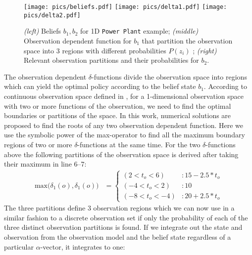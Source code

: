 \documentclass{article} %
\begin{document}
\begin{figure*}[tbp!]
\vspace{-6mm}
\centering
\hspace{-17mm}
\texttt{[image: pics/beliefs.pdf]}
\hspace{-12mm}
\texttt{[image: pics/delta1.pdf]}
\hspace{-12mm}
\texttt{[image: pics/delta2.pdf]}
\hspace{-17mm}
\vspace{-10mm}
\caption{\footnotesize 
{\it (left)} Beliefs $b_1,b_2$ for 1D \texttt{Power Plant} example; 
{\it (middle)} Observation dependent function for $b_1$ that partition the observation space into 3 regions with different probabilities $P(z_i)$ ; 
{\it (right)} Relevant observation partitions and their probabilities for $b_2$.
}
\label{fig:timeSpace}
\vspace{-4mm}
\end{figure*}
The observation dependent $\delta$-functions divide the observation space into regions which can yield the optimal policy according to the belief state $b_1$. According to continuous observation space defined in \cite{pascal_ijcai05}, for a 1-dimensional observation space with two or more functions of the observation, we need to find the optimal boundaries or partitions of the space. In this work, numerical solutions are proposed to find the roots of any two observation dependent function. Here we use the symbolic power of the max-operator to find all the maximum boundary regions of two or more $\delta$-functions at the same time. For the two $\delta$-functions above the following partitions of the observation space is derived after taking their maximum in line 6--7: 
{\footnotesize
\begin{align}
\mathrm{max} \Bigg(\delta_{1}(o),\delta_{1}(o)\Bigg) &= 
\begin{cases}
 (2<t_o<6) &: 15 - 2.5*t_o \\
(-4<t_o<2) &: 10 \\
(-8<t_o<-4) &: 20 + 2.5*t_o 
\end{cases}
\nonumber
\end{align}
}
The three partitions define 3 observation regions which we can now use in a similar fashion to a discrete observation set if only the probability of each of the three distinct observation partitions is found. If we integrate out the state and observation from the observation model and the belief state regardless of a particular $\alpha$-vector, it integrates to one: 
\end{document}
